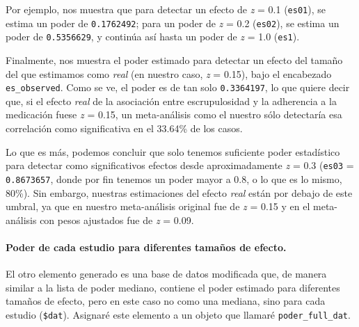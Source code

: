 \documentclass[
  bookmarksnumbered]{article}
\newenvironment{Shaded}{\begin{snugshade}}{\end{snugshade}}
\newcommand{\NormalTok}[1]{\textcolor[rgb]{0.12,0.11,0.11}{#1}}
\newcommand{\OtherTok}[1]{\textcolor[rgb]{0.00,0.43,0.16}{#1}}
\newcommand{\SpecialCharTok}[1]{\textcolor[rgb]{0.24,0.68,0.91}{#1}}
\begin{document}
Por ejemplo, nos muestra que para detectar un efecto de \emph{z} = 0.1 (\texttt{es01}), se estima un poder de \texttt{0.1762492}; para un poder de \emph{z} = 0.2 (\texttt{es02}), se estima un poder de \texttt{0.5356629}, y continúa así hasta un poder de \emph{z} = 1.0 (\texttt{es1}).

Finalmente, nos muestra el poder estimado para detectar un efecto del tamaño del que estimamos como \emph{real} (en nuestro caso, \emph{z} = 0.15), bajo el encabezado \texttt{es\_observed}. Como se ve, el poder es de tan solo \texttt{0.3364197}, lo que quiere decir que, si el efecto \emph{real} de la asociación entre escrupulosidad y la adherencia a la medicación fuese \emph{z} = 0.15, un meta-análisis como el nuestro sólo detectaría esa correlación como significativa en el 33.64\% de los casos.

Lo que es más, podemos concluir que solo tenemos suficiente poder estadístico para detectar como significativos efectos desde aproximadamente \emph{z} = 0.3 (\texttt{es03} = \texttt{0.8673657}, donde por fin tenemos un poder mayor a 0.8, o lo que es lo mismo, 80\%). Sin embargo, nuestras estimaciones del efecto \emph{real} están por debajo de este umbral, ya que en nuestro meta-análisis original fue de \emph{z} = 0.15 y en el meta-análisis con pesos ajustados fue de \emph{z} = 0.09.

\hypertarget{poder-de-cada-estudio-para-diferentes-tamauxf1os-de-efecto.}{%
\paragraph{Poder de cada estudio para diferentes tamaños de efecto.}\label{poder-de-cada-estudio-para-diferentes-tamauxf1os-de-efecto.}}

El otro elemento generado es una base de datos modificada que, de manera similar a la lista de poder mediano, contiene el poder estimado para diferentes tamaños de efecto, pero en este caso no como una mediana, sino para cada estudio (\texttt{\$dat}). Asignaré este elemento a un objeto que llamaré \texttt{poder\_full\_dat}.

\begin{Shaded}
\end{Shaded}
\end{document}
